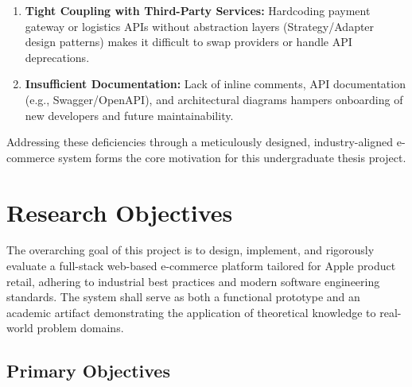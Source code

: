 \documentclass[12pt, a4paper]{report}
\begin{document}
\begin{enumerate}
    \item \textbf{Tight Coupling with Third-Party Services:} Hardcoding payment gateway or logistics APIs without abstraction layers (Strategy/Adapter design patterns) makes it difficult to swap providers or handle API deprecations.
    
    \item \textbf{Insufficient Documentation:} Lack of inline comments, API documentation (e.g., Swagger/OpenAPI), and architectural diagrams hampers onboarding of new developers and future maintainability.
\end{enumerate}

\vspace{0.5cm}
\noindent Addressing these deficiencies through a meticulously designed, industry-aligned e-commerce system forms the core motivation for this undergraduate thesis project.

\section{Research Objectives}

The overarching goal of this project is to design, implement, and rigorously evaluate a full-stack web-based e-commerce platform tailored for Apple product retail, adhering to industrial best practices and modern software engineering standards. The system shall serve as both a functional prototype and an academic artifact demonstrating the application of theoretical knowledge to real-world problem domains.

\subsection{Primary Objectives}
\end{document}
